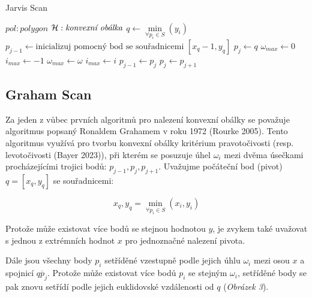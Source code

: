 \begin{algorithm}[h]
\caption{Jarvis Scan}\label{alg:cap}
\begin{algorithmic}
\Require $pol: polygon$
\Ensure $\mathcal{H}: {\text{\emph{konvexní obálka}}}$
\State
\State $q \gets {\text{$\underset{\forall p_i \in S}{\min}(y_i)$}}$
\State $p_{j-1} \gets {\text{inicializuj pomocný bod se souřadnicemi $[x_{q}-1, y_q]$} }$
\State $p_j \gets q$ 
\State
{}
  \State $\omega_{max} \gets 0$ 
  \State $i_{max} \gets -1$ 
  \State
      \State $\omega_{max} \gets \omega$ 
      \State $i_{max} \gets i$ 
      \EndIf
    \EndIf
  \EndFor
  \State
  \State $p_{j-1} \gets p_j$
  \State $p_j \gets p_{j+1}$
  \State
   
  \EndIf
\EndWhile
\State
{}

\end{algorithmic}
\end{algorithm}

\newpage

\subsection*{Graham Scan}

\par Za jeden z vůbec prvních algoritmů pro nalezení konvexní obálky se považuje algoritmus popsaný Ronaldem Grahamem v roku 1972 (Rourke 2005). Tento algoritmus využívá pro tvorbu konvexní obálky kritérium pravotočivosti (resp. levotočivosti (Bayer 2023)), při kterém se posuzuje úhel  $\omega_i$ mezi dvěma úsečkami procházejícími trojici bodů: $p_{j-1}, p_j, p_{j+1}$. Uvažujme počáteční bod (pivot) $q = [x_q, y_q]$ se souřadnicemi: 

\begin{equation*}
x_q, y_q = \underset{\forall p_i \in S}{\min}(x_i, y_i)
\end{equation*}

\par Protože může existovat více bodů se stejnou hodnotou $y$, je zvykem také uvažovat s jednou z extrémních hodnot $x$ pro jednoznačné nalezení pivota.
\par Dále jsou všechny body $p_i$ setříděné vzestupně podle jejich úhlu $\omega_i$ mezi osou $x$ a spojnicí $\overline{ qp_j}$. Protože může existovat více bodů $p_i$ se stejným $\omega_i$, setříděné body se pak znovu setřídí podle jejich euklidovské vzdálenosti od $q$ (\emph{Obrázek 3}). 

